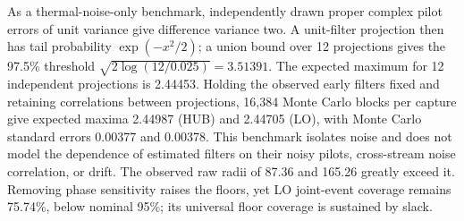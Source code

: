 \documentclass[10pt,letterpaper]{article}
\begin{document}
As a thermal-noise-only benchmark, independently drawn proper complex pilot errors of unit variance give difference variance two. A unit-filter projection then has tail probability \(\exp(-x^2/2)\); a union bound over 12 projections gives the 97.5\% threshold \(\sqrt{2\log(12/0.025)}=3.51391\). The expected maximum for 12 independent projections is 2.44453. Holding the observed early filters fixed and retaining correlations between projections, 16,384 Monte Carlo blocks per capture give expected maxima 2.44987 (HUB) and 2.44705 (LO), with Monte Carlo standard errors 0.00377 and 0.00378. This benchmark isolates noise and does not model the dependence of estimated filters on their noisy pilots, cross-stream noise correlation, or drift. The observed raw radii of 87.36 and 165.26 greatly exceed it. Removing phase sensitivity raises the floors, yet LO joint-event coverage remains 75.74\%, below nominal 95\%; its universal floor coverage is sustained by slack.
\end{document}
